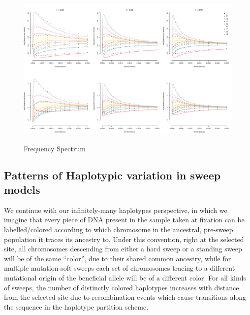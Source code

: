 \documentclass[a4paper,10pt]{article}
\newcommand{\jb}[1]{{\it\color{blue} (#1)} }
\begin{document}
\begin{figure}
	\includegraphics[width = \textwidth]{../Paper_Figures/freq_spec_nosweep_logfold_sixpanel_020507.pdf} \label{freq_spec}
	\caption{Frequency Spectrum}
\end{figure}

\subsection{Patterns of Haplotypic variation in sweep models}

%

We continue with our infinitely-many haplotypes perspective, in which we imagine that every piece of DNA present in the sample taken at fixation can be labelled/colored according to which chromosome in the ancestral, pre-sweep population it traces its ancestry to. Under this convention, right at the selected site, all chromosomes descending from either a hard sweep or a standing sweep will be of the same ``color'', due to their shared common ancestry, while for multiple mutation soft sweeps each set of chromosomes tracing to a different mutational origin of the beneficial allele will be of a different color. For all kinds of sweeps, the number of distinctly colored haplotypes increases with distance from the selected site due to recombination events which cause transitions along the sequence in the haplotype partition scheme.
\end{document}
